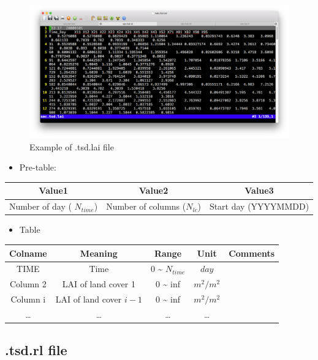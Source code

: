 \documentclass[]{scrbook}
\providecommand{\tightlist}{%
  \setlength{\itemsep}{0pt}\setlength{\parskip}{0pt}}
\begin{document}
\begin{figure}
\centering
\includegraphics{Fig/IO/tsd.lai.png}
\caption{Example of .tsd.lai file}
\end{figure}

\begin{itemize}
\tightlist
\item
  Pre-table:
\end{itemize}

\begin{longtable}[]{@{}ccc@{}}
\toprule
Value1 & Value2 & Value3\tabularnewline
\midrule
\endhead
Number of day ( \(N_{time}\)) & Number of columns (\(N_{lc}\)) & Start
day (YYYYMMDD)\tabularnewline
\bottomrule
\end{longtable}

\begin{itemize}
\tightlist
\item
  Table
\end{itemize}

\begin{longtable}[]{@{}ccccc@{}}
\toprule
Colname & Meaning & Range & Unit & Comments\tabularnewline
\midrule
\endhead
TIME & Time & 0 \textasciitilde{} \(N_{time}\) & \(day\)
&\tabularnewline
Column 2 & LAI of land cover 1 & 0 \textasciitilde{} inf & \(m^2/m^2\)
&\tabularnewline
Column i & LAI of land cover \(i-1\) & 0 \textasciitilde{} inf &
\(m^2/m^2\) &\tabularnewline
\ldots{} & \ldots{} & \ldots{} & \ldots{} &\tabularnewline
\bottomrule
\end{longtable}

\subsection{.tsd.rl file}\label{tsd.rl-file}
\end{document}
